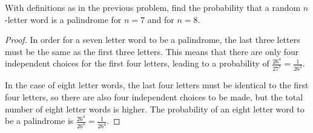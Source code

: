 \begin{exercise}{28}
    With definitions as in the previous problem, find the probability that a random $n$-letter
word is a palindrome for $n = 7$ and for $n = 8$.
\end{exercise}

\begin{proof}
    In order for a seven letter word to be a palindrome, the last three letters must be the same as the first three letters. This means that there are only four independent choices for the first four letters, leading to a probability of $\frac{26^4}{27^7} = \frac{1}{26^3}$.

    In the case of eight letter words, the last four letters must be identical to the first four letters, so there are also four independent choices to be made, but the total number of eight letter words is higher. The probability of an eight letter word to be a palindrome is $\frac{26^4}{26^8} = \frac{1}{26^4}$.
    
\end{proof}

